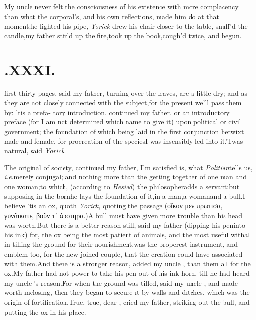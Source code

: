 \documentclass[twoside]{article}
\begin{document}
My uncle \toby never felt the consci\-ousness of his
existence with more complacency than what the corporal’s, and
his own reflections, made him do at that moment;\tsh he
lighted his pipe,\tsh\break
\textit{Yorick} drew his chair closer to the table,\break
\tsk \trim snuff’d the candle,\tsk my
father stir’d up the fire,\tsk took up the
book,\tsk cough’d twice, and begun.

\section{.\enspace  XXXI.}

 first thirty pages, said my\break
father, turning over the leaves,\tsk\break
are a little dry; and as they are not closely connected with the
subject,\tsh for the present we’ll pass them by: ’tis a prefa- tory
introduction, continued my father, or an introductory preface (for I am
not determined which name to give it) upon political or civil
government; the foundation of which being laid in the first conjunction
betwixt male and female,\break
for procreation of the species\tsh I was
insensibly led into it.\tsh ’Twas natural, said \textit{Yorick}.

The original of society, continued my father, I’m
satisfied is, what \textit{Politian}\break tells
us, \textit{i}.\@ \textit{e}.\@ merely conjugal;
and no\-thing more than the getting together of one
man and one woman;\tsk to which, (according to
\textit{Hesiod}) the philosopher\break adds a
servant:\tsk but supposing in the  born\tsh he lays the
foundation of it,\break in a man,\tsk a woman\tsk and a
bull.\tsh I believe ’tis an ox, quoth
\textit{Yorick}, quoting the passage ({\small οἶκον
μὲν πρώτισα\sic, γυνᾶικα\break τε, βοῦν τ᾽ ἀροτηρα}.)\tsh A
bull must have given more trouble than
his head was worth.\tsh But there is a better
reason still, said my father (dipping his pen\break into
his ink) for, the ox being the most patient of
animals, and the most useful withal in tilling the
ground for their nourishment,\tsk was the properest
instrument, and emblem too, for the new join\-ed
couple, that the creation could have associated
with them.\tsk And there is a stronger reason,
added my uncle \toby, than them all for the
ox.\tsk My father had not power to take his pen out
of his ink-horn, till he had heard my uncle
\toby's reason.\tsk For when the ground was
til\-led, said my uncle \toby, and made worth
inclosing, then they began to secure it by walls
and ditches, which was the origin of
fortification.\tsh True, true, dear \toby,
cried my father, striking out the bull, and putting
the ox in his place.
\end{document}
